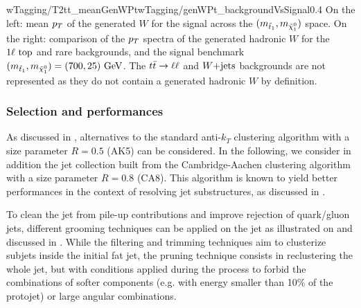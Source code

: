                       {wTagging/T2tt_meanGenWPt}{wTagging/genWPt_backgroundVsSignal}{0.4}
                      {On the left: mean $p_T$ of the generated $W$ for the
                      signal across the $(m_{\tilde{t}_1}, m_{\tilde{\chi}_1^0})$ space.
                      On the right: comparison of the $p_T$ spectra of the generated
                      hadronic $W$ for the $1\ell~\text{top}$ and rare backgrounds, and
                      the signal benchmark $(m_{\tilde{t}_1}, m_{\tilde{\chi}_1^0}) = (700,25) ~\text{GeV}$.
                      The $t\bar{t} \rightarrow \ell \ell$ and $\text{$W$+jets}$ backgrounds are not represented
                      as they do not contain a generated hadronic $W$ by definition.}

    \subsubsection{Selection and performances}

    As discussed in , alternatives to the
    standard anti-$k_T$ clustering algorithm with a size parameter $R = 0.5$
    (AK5) can be considered. In the following, we consider in addition the jet
    collection built from the Cambridge-Aachen clustering algorithm with a size
    parameter $R = 0.8$ (CA8). This algorithm is known to yield better performances
    in the context of resolving jet substructures, as discussed in
    \cite{jetSubstructureSalam, jetClusteringComparison}.


    To clean the jet from pile-up contributions and improve rejection of
    quark/gluon jets, different grooming techniques can be applied on the jet
    as illustrated on  and discussed in
    \cite{jetClusteringComparison, JME-13-006}.
    While the filtering and trimming techniques aim to clusterize subjets inside
    the initial fat jet, the pruning technique consists in reclustering the whole
    jet, but with conditions applied during the process to forbid the combinations
    of softer components (e.g. with energy smaller than 10\% of the protojet) or
    large angular combinations.

